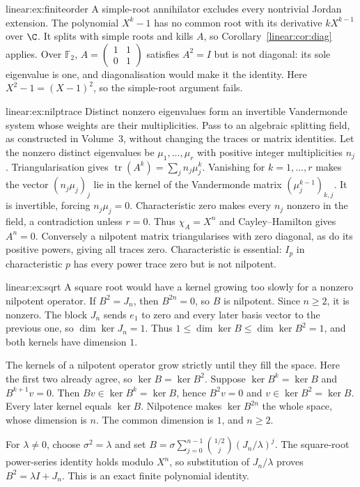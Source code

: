 \begin{solution}{linear:ex:finiteorder}
\idea A simple-root annihilator excludes every nontrivial Jordan extension.
\writeup The polynomial $X^k-1$ has no common root with its derivative $kX^{k-1}$ over $\C$. It splits with simple roots and kills $A$, so Corollary~\ref{linear:cor:diag} applies. Over $\mathbb F_2$, $A=\begin{pmatrix}1&1\\0&1\end{pmatrix}$ satisfies $A^2=I$ but is not diagonal: its sole eigenvalue is one, and diagonalisation would make it the identity. Here $X^2-1=(X-1)^2$, so the simple-root argument fails.
\end{solution}
\begin{solution}{linear:ex:nilptrace}
\idea Distinct nonzero eigenvalues form an invertible Vandermonde system whose weights are their multiplicities.
\writeup Pass to an algebraic splitting field, as constructed in Volume~3, without changing the traces or matrix identities. Let the nonzero distinct eigenvalues be $\mu_1,\ldots,\mu_r$ with positive integer multiplicities $n_j$. Triangularisation gives $\operatorname{tr}(A^k)=\sum_jn_j\mu_j^k$. Vanishing for $k=1,\ldots,r$ makes the vector $(n_j\mu_j)_j$ lie in the kernel of the Vandermonde matrix $(\mu_j^{k-1})_{k,j}$. It is invertible, forcing $n_j\mu_j=0$. Characteristic zero makes every $n_j$ nonzero in the field, a contradiction unless $r=0$. Thus $\chi_A=X^n$ and Cayley--Hamilton gives $A^n=0$. Conversely a nilpotent matrix triangularises with zero diagonal, as do its positive powers, giving all traces zero. Characteristic is essential: $I_p$ in characteristic $p$ has every power trace zero but is not nilpotent.
\end{solution}
\begin{solution}{linear:ex:sqrt}
\idea A square root would have a kernel growing too slowly for a nonzero nilpotent operator.
\writeup If $B^2=J_n$, then $B^{2n}=0$, so $B$ is nilpotent. Since $n\ge2$, it is nonzero. The block $J_n$ sends $e_1$ to zero and every later basis vector to the previous one, so $\dim\ker J_n=1$. Thus $1\le\dim\ker B\le\dim\ker B^2=1$, and both kernels have dimension $1$.

The kernels of a nilpotent operator grow strictly until they fill the space. Here the first two already agree, so $\ker B=\ker B^2$. Suppose $\ker B^k=\ker B$ and $B^{k+1}v=0$. Then $Bv\in\ker B^k=\ker B$, hence $B^2v=0$ and $v\in\ker B^2=\ker B$. Every later kernel equals $\ker B$. Nilpotence makes $\ker B^{2n}$ the whole space, whose dimension is $n$. The common dimension is $1$, and $n\ge2$.

For $\lambda\ne0$, choose $\sigma^2=\lambda$ and set $B=\sigma\sum_{j=0}^{n-1}\binom{1/2}{j}(J_n/\lambda)^j$. The square-root power-series identity holds modulo $X^n$, so substitution of $J_n/\lambda$ proves $B^2=\lambda I+J_n$. This is an exact finite polynomial identity.
\end{solution}
